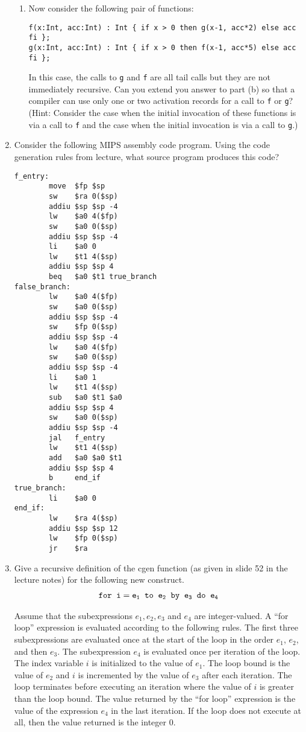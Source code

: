 \documentclass{article}
\begin{document}
\begin{enumerate}
\begin{enumerate}
\item Now consider the following pair of functions:
\begin{verbatim}
f(x:Int, acc:Int) : Int { if x > 0 then g(x-1, acc*2) else acc fi };
g(x:Int, acc:Int) : Int { if x > 0 then f(x-1, acc*5) else acc fi };
\end{verbatim}
In this case, the calls to \texttt{g} and \texttt{f} are all tail
calls but they are not immediately recursive.  Can you extend you
answer to part (b) so that a compiler can use only one or two
activation records for a call to \texttt{f} or \texttt{g}?  (Hint:
Consider the case when the initial invocation of these functions is
via a call to \texttt{f} and the case when the initial invocation is
via a call to \texttt{g}.)
\end{enumerate}

\item Consider the following MIPS assembly code program.  Using the
code generation rules from lecture, what source program produces this
code?
\begin{verbatim}
f_entry:
        move  $fp $sp
        sw    $ra 0($sp)
        addiu $sp $sp -4
        lw    $a0 4($fp)
        sw    $a0 0($sp)
        addiu $sp $sp -4
        li    $a0 0
        lw    $t1 4($sp)
        addiu $sp $sp 4
        beq   $a0 $t1 true_branch
false_branch:
        lw    $a0 4($fp)
        sw    $a0 0($sp)
        addiu $sp $sp -4
        sw    $fp 0($sp)
        addiu $sp $sp -4
        lw    $a0 4($fp)
        sw    $a0 0($sp)
        addiu $sp $sp -4
        li    $a0 1
        lw    $t1 4($sp)
        sub   $a0 $t1 $a0
        addiu $sp $sp 4
        sw    $a0 0($sp)
        addiu $sp $sp -4
        jal   f_entry
        lw    $t1 4($sp)
        add   $a0 $a0 $t1
        addiu $sp $sp 4
        b     end_if
true_branch:
        li    $a0 0
end_if:
        lw    $ra 4($sp)
        addiu $sp $sp 12
        lw    $fp 0($sp)
        jr    $ra
\end{verbatim}

\item Give a recursive definition of the cgen function (as given in
  slide 52 in the lecture notes) for the following new construct. 
\begin{eqnarray*}
\tt{for}\;\; i = e_1 \;\;to\;\; e_2 \;\;\tt{by}\;\; e_3 \;\;\tt{do }\;\; e_4
\end{eqnarray*}

Assume that the subexpressions $e_1, e_2, e_3$ and $e_4$ are
integer-valued. A ``for loop'' expression is evaluated according to
the following rules. The first three subexpressions are evaluated once 
at the start of the loop in the order $e_1$, $e_2$, and then $e_3$. 
The subexpression $e_4$ is evaluated once per iteration of the loop.
The index variable $i$ is initialized to the value of $e_1$. 
The loop bound is the value of $e_2$ and $i$ is incremented by the 
value of $e_3$ after each iteration. The loop terminates before
executing an iteration where the value of $i$ is greater than the 
loop bound. The value returned by the ``for loop'' expression is the value of the
expression $e_4$ in the last iteration. If the loop does not execute
at all, then the value returned is the integer $0$. 


\end{enumerate}
\end{document}
